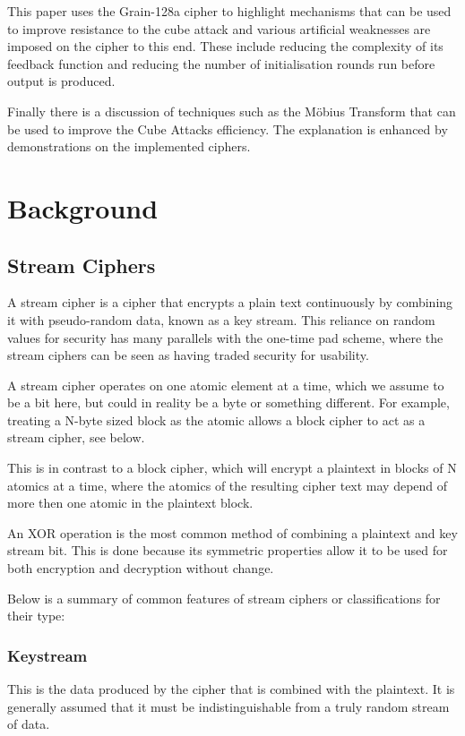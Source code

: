 \documentclass{report}
\let\Oldsection\section
\renewcommand{\section}{\FloatBarrier\Oldsection}
\let\Oldsubsection\subsection
\renewcommand{\subsection}{\FloatBarrier\Oldsubsection}
\begin{document}
This paper uses the Grain-128a cipher to highlight mechanisms that can be used to improve resistance to the cube attack and various artificial weaknesses are imposed on the cipher to this end. These include reducing the complexity of its feedback function and reducing the number of initialisation rounds run before output is produced.

Finally there is a discussion of techniques such as the Möbius Transform that can be used to improve the Cube Attacks efficiency. The explanation is enhanced by demonstrations on the implemented ciphers.

\chapter{Background}
\section{Stream Ciphers}
A stream cipher is a cipher that encrypts a plain text continuously by combining it with pseudo-random data, known as a key stream. This reliance on random values for security has many parallels with the one-time pad scheme, where the stream ciphers can be seen as having traded security for usability.

A stream cipher operates on one atomic element at a time, which we assume to be a bit here, but could in reality be a byte or something different. For example, treating a N-byte sized block as the atomic allows a block cipher to act as a stream cipher, see below.

This is in contrast to a block cipher, which will encrypt a plaintext in blocks of N atomics at a time, where the atomics of the resulting cipher text may depend of more then one atomic in the plaintext block.

An XOR operation is the most common method of combining a plaintext and key stream bit. This is done because its symmetric properties allow it to be used for both encryption and decryption without change.

Below is a summary of common features of stream ciphers or classifications for their type:

\subsection{Keystream}
This is the data produced by the cipher that is combined with the plaintext. It is generally assumed that it must be indistinguishable from a truly random stream of data.
\end{document}
